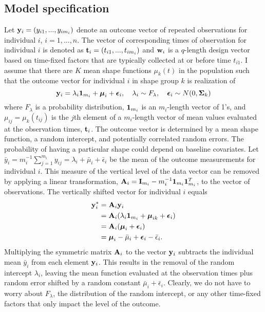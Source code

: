 \subsection{Model specification}\label{sub:vmod}
Let $\mathbf y_{i}=(y_{i1},...,y_{im_{i}})$ denote an outcome vector of repeated observations for individual $i$, $i=1,...,n$. The vector of corresponding times of observation for individual $i$ is denoted as $\mathbf t_{i}=(t_{i1},...,t_{im_{i}})$ and $\mathbf w_{i}$ is a $q$-length design vector based on time-fixed factors that are typically collected at or before time $t_{i1}$. I assume that there are $K$ mean shape functions $\mu_{k}(t)$ in the population such that the outcome vector for individual $i$ in shape group $k$ is  realization of
 $$\mathbf y_{i} = \lambda_{i}\mathbf 1_{m_{i}}+\boldsymbol\mu_{i}+\boldsymbol\epsilon_{i},\quad \lambda_{i}\sim F_{\lambda}, \quad \boldsymbol\epsilon_{i}\sim N(0,\boldsymbol\Sigma_{k})$$
 where $F_{\lambda}$ is a probability distribution, $\mathbf 1_{m_{i}}$ is an $m_{i}$-length vector of 1's, and $\mu_{ij} = \mu_{k}(t_{ij})$ is the $j$th element of a $m_{i}$-length vector of mean values evaluated at the observation times, $\mathbf t_{i}$. The outcome vector is determined by a mean shape function, a random intercept, and potentially correlated random errors. The probability of having a particular shape could depend on baseline covariates. Let $\bar{y}_{i}= m_{i}^{-1}\sum^{m_{i}}_{j=1} y_{ij} = \lambda_{i}+\bar{\mu}_{i}+\bar{\epsilon}_{i}$ be the mean of the outcome measurements for individual $i$. This measure of the vertical level of the data vector can be removed by applying a linear transformation, $\mathbf A_{i} = \mathbf I_{m_{i}} - m_{i}^{-1}\mathbf 1_{m_{i}}\mathbf 1_{m_{i}}^{T}$, to the vector of observations. The vertically shifted vector for individual $i$ equals 
\begin{align*}
\mathbf y^{*}_{i} &= \mathbf A_{i}\mathbf y_{i}\\
&=\mathbf A_{i}(\lambda_{i}\mathbf 1_{m_{i}}+\boldsymbol\mu_{ik}+\boldsymbol\epsilon_{i})\\
&=\mathbf A_{i}(\boldsymbol\mu_{i}+\boldsymbol\epsilon_{i})\\
&=\boldsymbol\mu_{i} - \bar{\mu}_{i}+\boldsymbol\epsilon_{i}-\bar{\epsilon}_{i}.
\end{align*}
Multiplying the symmetric matrix $\mathbf A_{i}$ to the vector $\mathbf y_{i}$ subtracts the individual mean $\bar{y}_{i}$ from each element $\mathbf y_{i}$. This results in the removal of the random intercept $\lambda_{i}$, leaving the mean function evaluated at the observation times plus random error shifted by a random constant $\bar{\mu}_{i}+\bar{\epsilon}_{i}$. Clearly, we do not have to worry about $F_{\lambda}$, the distribution of the random intercept, or any other time-fixed factors that only impact the level of the outcome. 

